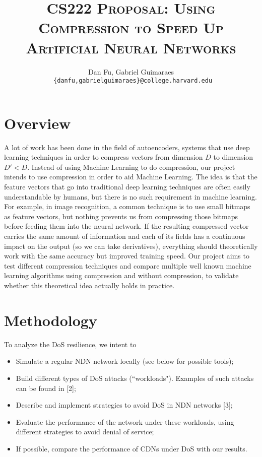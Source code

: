 \documentclass[12pt]{article}
\title{{\textsc{CS222 Proposal: Using Compression to Speed Up Artificial Neural Networks}}}
\author{Dan Fu, Gabriel Guimaraes \\
{\small \texttt{ \{danfu,gabrielguimaraes\}@college.harvard.edu}}}
\begin{document}
\hypersetup{linkcolor = black}

\maketitle

\section{Overview}

A lot of work has been done in the field of autoencoders, systems that use deep learning techniques in order to compress vectors from dimension $D$ to dimension $D' < D$. Instead of using Machine Learning to do compression, our project intends to use compression in order to aid Machine Learning. The idea is that the feature vectors that go into traditional deep learning techniques are often easily understandable by humans, but there is no such requirement in machine learning. For example, in image recognition, a common technique is to use small bitmaps as feature vectors, but nothing prevents us from compressing those bitmaps before feeding them into the neural network. If the resulting compressed vector carries the same amount of information and each of its fields has a continuous impact on the output (so we can take derivatives), everything should theoretically work with the same accuracy but improved training speed. Our project aims to test different compression techniques and compare multiple well known machine learning algorithms using compression and without compression, to validate whether this theoretical idea actually holds in practice.

\section{Methodology}

To analyze the DoS resilience, we intent to

\begin{itemize}
\item Simulate a regular NDN network locally (see below for possible tools);
\item Build different types of DoS attacks (``workloads"). Examples of such attacks can be found in [2];
\item Describe and implement strategies to avoid DoS in NDN networks [3];
\item Evaluate the performance of the network under these workloads, using different strategies to avoid denial of service;
\item If possible, compare the performance of CDNs under DoS with our results.
\end{itemize}
\end{document}
